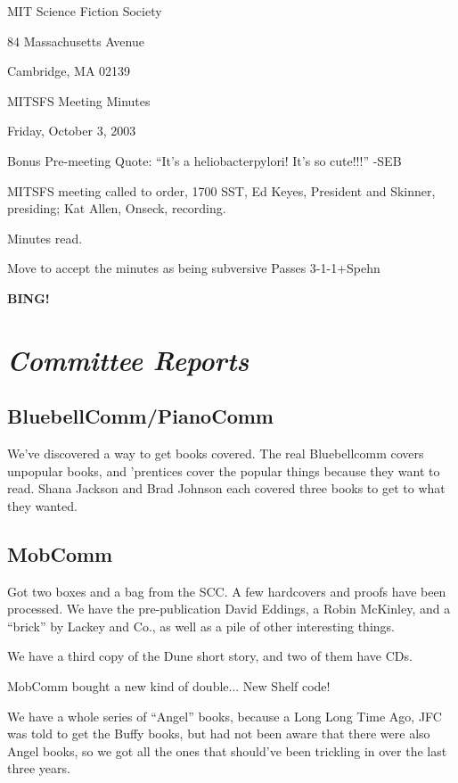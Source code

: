 \documentclass[10pt]{article}
\newcommand{\bing}{{\bf BING!} }
\newcommand{\goto}[1]{\bing \vskip 12pt \section*{{\em{#1}}}}
\begin{document}
\begin{center}

MIT Science Fiction Society 

84 Massachusetts Avenue

Cambridge, MA 02139

\vspace{12pt}

MITSFS Meeting Minutes 

Friday, October 3, 2003

\end{center}
 
\vspace{18pt}

\setlength{\parskip}{6pt}
Bonus Pre-meeting Quote: ``It's a heliobacterpylori! It's so cute!!!'' -SEB

\noindent
MITSFS meeting called to order, 1700 SST, Ed Keyes, President and
Skinner, presiding; Kat Allen,  Onseck, recording.

Minutes read.

Move to accept the minutes as being subversive
Passes 3-1-1+Spehn

\goto{Committee Reports}
\subsection*{BluebellComm/PianoComm}
We've discovered a way to get books covered. The real Bluebellcomm
covers unpopular books, and 'prentices cover the popular things
because they want to read. Shana Jackson and Brad Johnson each
covered three books to get to what they wanted.

\subsection*{MobComm}
Got two boxes and a bag from the SCC. A few hardcovers and proofs have
been processed. We have the pre-publication David Eddings, a Robin
McKinley, and a ``brick'' by Lackey and Co., as well as a pile of
other interesting things.

We have a third copy of the Dune short story, and two of them have
CDs.

MobComm bought a new kind of double... New Shelf code!

We have a whole series of ``Angel'' books, because a Long Long Time
Ago, JFC was told to get the Buffy books, but had not been aware that
there were also Angel books, so we got all the ones that should've
been trickling in over the last three years.
\end{document}
